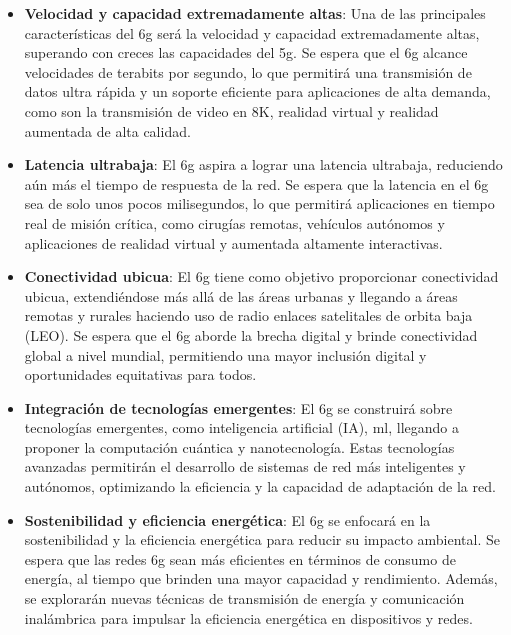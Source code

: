 \begin{itemize}

    \item \textbf{Velocidad y capacidad extremadamente altas}: Una de las principales características del \gls{6g} será la velocidad y capacidad extremadamente altas, superando con creces las capacidades del \gls{5g}. Se espera que el \gls{6g} alcance velocidades de terabits por segundo, lo que permitirá una transmisión de datos ultra rápida y un soporte eficiente para aplicaciones de alta demanda, como son la transmisión de video en 8K, realidad virtual y realidad aumentada de alta calidad.

    \item \textbf{Latencia ultrabaja}: El \gls{6g} aspira a lograr una latencia ultrabaja, reduciendo aún más el tiempo de respuesta de la red. Se espera que la latencia en el \gls{6g} sea de solo unos pocos milisegundos, lo que permitirá aplicaciones en tiempo real de misión crítica, como cirugías remotas, vehículos autónomos y aplicaciones de realidad virtual y aumentada altamente interactivas.

    \item \textbf{Conectividad ubicua}: El \gls{6g} tiene como objetivo proporcionar conectividad ubicua, extendiéndose más allá de las áreas urbanas y llegando a áreas remotas y rurales haciendo uso de radio enlaces satelitales de orbita baja (LEO). Se espera que el \gls{6g} aborde la brecha digital y brinde conectividad global a nivel mundial, permitiendo una mayor inclusión digital y oportunidades equitativas para todos.

    \item \textbf{Integración de tecnologías emergentes}: El \gls{6g} se construirá sobre tecnologías emergentes, como inteligencia artificial (IA), \gls{ml}, llegando a proponer la computación cuántica y nanotecnología. Estas tecnologías avanzadas permitirán el desarrollo de sistemas de red más inteligentes y autónomos, optimizando la eficiencia y la capacidad de adaptación de la red.

    \item \textbf{Sostenibilidad y eficiencia energética}: El \gls{6g} se enfocará en la sostenibilidad y la eficiencia energética para reducir su impacto ambiental. Se espera que las redes \gls{6g} sean más eficientes en términos de consumo de energía, al tiempo que brinden una mayor capacidad y rendimiento. Además, se explorarán nuevas técnicas de transmisión de energía y comunicación inalámbrica para impulsar la eficiencia energética en dispositivos y redes.

\end{itemize}

